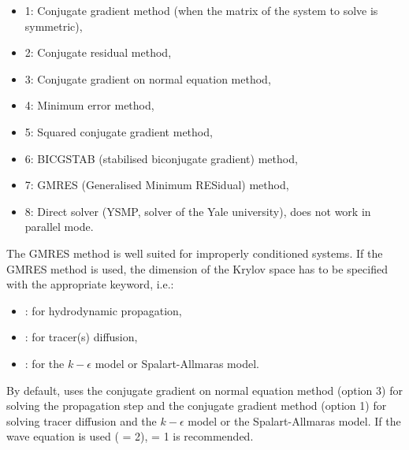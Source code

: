 \begin{itemize}
\item 1: Conjugate gradient method (when the matrix of the system to solve
is symmetric),

\item 2: Conjugate residual method,

\item 3: Conjugate gradient on normal equation method,

\item 4: Minimum error method,

\item 5: Squared conjugate gradient method,

\item 6: BICGSTAB (stabilised biconjugate gradient) method,

\item 7: GMRES (Generalised Minimum RESidual) method,

\item 8: Direct solver (YSMP, solver of the Yale university),
does not work in parallel mode.

\end{itemize}

The GMRES method is well suited for improperly conditioned systems.
If the GMRES method is used, the dimension of the Krylov space has to be
specified with the appropriate keyword, i.e.:

\begin{itemize}
\item {}: for hydrodynamic propagation,

\item {}: for tracer(s) diffusion,

\item {}:
for the $k-\epsilon$ model or Spalart-Allmaras model.
\end{itemize}

By default,  uses the conjugate gradient on normal equation method
(option 3) for solving the propagation step
and the conjugate gradient method (option 1) for solving tracer diffusion and
the $k-\epsilon$ model or the Spalart-Allmaras model.
If the wave equation is used ( = 2),
 = 1 is recommended.

